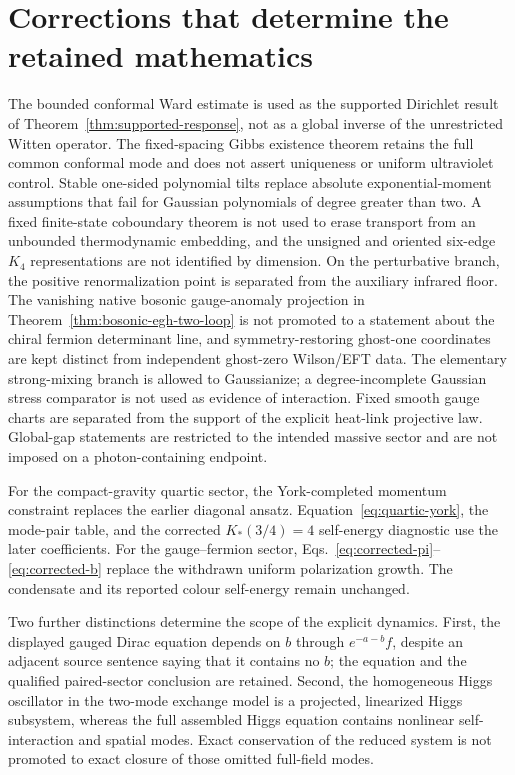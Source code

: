 \documentclass[11pt,a4paper,oneside]{book}
\theoremstyle{plain}
\theoremstyle{definition}
\theoremstyle{remark}
\begin{document}
\section{Corrections that determine the retained mathematics}
The bounded conformal Ward estimate is used as the supported Dirichlet result of Theorem~\ref{thm:supported-response}, not as a global inverse of the unrestricted Witten operator. The fixed-spacing Gibbs existence theorem retains the full common conformal mode and does not assert uniqueness or uniform ultraviolet control. Stable one-sided polynomial tilts replace absolute exponential-moment assumptions that fail for Gaussian polynomials of degree greater than two.  A fixed finite-state coboundary theorem is not used to erase transport from an unbounded thermodynamic embedding, and the unsigned and oriented six-edge $K_4$ representations are not identified by dimension.  On the perturbative branch, the positive renormalization point is separated from the auxiliary infrared floor.  The vanishing native bosonic gauge-anomaly projection in Theorem~\ref{thm:bosonic-egh-two-loop} is not promoted to a statement about the chiral fermion determinant line, and symmetry-restoring ghost-one coordinates are kept distinct from independent ghost-zero Wilson/EFT data. The elementary strong-mixing branch is allowed to Gaussianize; a degree-incomplete Gaussian stress comparator is not used as evidence of interaction. Fixed smooth gauge charts are separated from the support of the explicit heat-link projective law. Global-gap statements are restricted to the intended massive sector and are not imposed on a photon-containing endpoint.

For the compact-gravity quartic sector, the York-completed momentum constraint replaces the earlier diagonal ansatz. Equation~\eqref{eq:quartic-york}, the mode-pair table, and the corrected $K_*(3/4)=4$ self-energy diagnostic use the later coefficients. For the gauge--fermion sector, Eqs.~\eqref{eq:corrected-pi}--\eqref{eq:corrected-b} replace the withdrawn uniform polarization growth. The condensate and its reported colour self-energy remain unchanged.

Two further distinctions determine the scope of the explicit dynamics. First, the displayed gauged Dirac equation depends on $b$ through $e^{-a-b}f$, despite an adjacent source sentence saying that it contains no $b$; the equation and the qualified paired-sector conclusion are retained. Second, the homogeneous Higgs oscillator in the two-mode exchange model is a projected, linearized Higgs subsystem, whereas the full assembled Higgs equation contains nonlinear self-interaction and spatial modes. Exact conservation of the reduced system is not promoted to exact closure of those omitted full-field modes.
\end{document}
